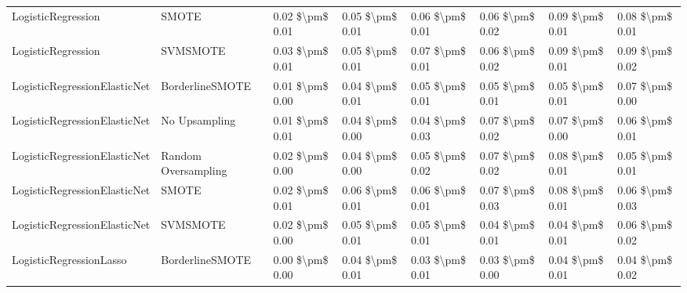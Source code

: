 \begin{tabular}{llllllll}
             LogisticRegression &                         SMOTE & 0.02 \$\textbackslash pm\$ 0.01 &           0.05 \$\textbackslash pm\$ 0.01 &       0.06 \$\textbackslash pm\$ 0.01 &        0.06 \$\textbackslash pm\$ 0.02 &                         0.09 \$\textbackslash pm\$ 0.01 &     0.08 \$\textbackslash pm\$ 0.01 \\
             LogisticRegression &                      SVMSMOTE & 0.03 \$\textbackslash pm\$ 0.01 &           0.05 \$\textbackslash pm\$ 0.01 &       0.07 \$\textbackslash pm\$ 0.01 &        0.06 \$\textbackslash pm\$ 0.02 &                         0.09 \$\textbackslash pm\$ 0.01 &     0.09 \$\textbackslash pm\$ 0.02 \\
   LogisticRegressionElasticNet &               BorderlineSMOTE & 0.01 \$\textbackslash pm\$ 0.00 &           0.04 \$\textbackslash pm\$ 0.01 &       0.05 \$\textbackslash pm\$ 0.01 &        0.05 \$\textbackslash pm\$ 0.01 &                         0.05 \$\textbackslash pm\$ 0.01 &     0.07 \$\textbackslash pm\$ 0.00 \\
   LogisticRegressionElasticNet &                 No Upsampling & 0.01 \$\textbackslash pm\$ 0.01 &           0.04 \$\textbackslash pm\$ 0.00 &       0.04 \$\textbackslash pm\$ 0.03 &        0.07 \$\textbackslash pm\$ 0.02 &                         0.07 \$\textbackslash pm\$ 0.00 &     0.06 \$\textbackslash pm\$ 0.01 \\
   LogisticRegressionElasticNet &           Random Oversampling & 0.02 \$\textbackslash pm\$ 0.00 &           0.04 \$\textbackslash pm\$ 0.00 &       0.05 \$\textbackslash pm\$ 0.02 &        0.07 \$\textbackslash pm\$ 0.02 &                         0.08 \$\textbackslash pm\$ 0.01 &     0.05 \$\textbackslash pm\$ 0.01 \\
   LogisticRegressionElasticNet &                         SMOTE & 0.02 \$\textbackslash pm\$ 0.01 &           0.06 \$\textbackslash pm\$ 0.01 &       0.06 \$\textbackslash pm\$ 0.01 &        0.07 \$\textbackslash pm\$ 0.03 &                         0.08 \$\textbackslash pm\$ 0.01 &     0.06 \$\textbackslash pm\$ 0.03 \\
   LogisticRegressionElasticNet &                      SVMSMOTE & 0.02 \$\textbackslash pm\$ 0.00 &           0.05 \$\textbackslash pm\$ 0.01 &       0.05 \$\textbackslash pm\$ 0.01 &        0.04 \$\textbackslash pm\$ 0.01 &                         0.04 \$\textbackslash pm\$ 0.01 &     0.06 \$\textbackslash pm\$ 0.02 \\
        LogisticRegressionLasso &               BorderlineSMOTE & 0.00 \$\textbackslash pm\$ 0.00 &           0.04 \$\textbackslash pm\$ 0.01 &       0.03 \$\textbackslash pm\$ 0.01 &        0.03 \$\textbackslash pm\$ 0.00 &                         0.04 \$\textbackslash pm\$ 0.01 &     0.04 \$\textbackslash pm\$ 0.02 \\

\end{tabular}
